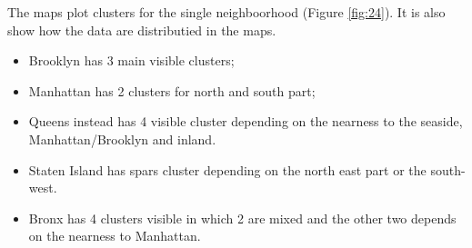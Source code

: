 \documentclass{FR16}
\begin{document}
\newpage
\noindent The maps plot clusters for the single neighboorhood (Figure \ref{fig:24}). It is also show how the data are distributied in the maps. 
\begin{itemize}
\item Brooklyn has 3 main visible clusters;
\item Manhattan has 2 clusters for north and south part; 
\item Queens instead has 4 visible cluster depending on the nearness to the seaside, Manhattan/Brooklyn and inland. 
\item Staten Island has spars cluster depending on the north east part or the south-west.
\item Bronx has 4 clusters visible in which 2 are mixed and the other two depends on the nearness to Manhattan.
\end{itemize}
\end{document}
